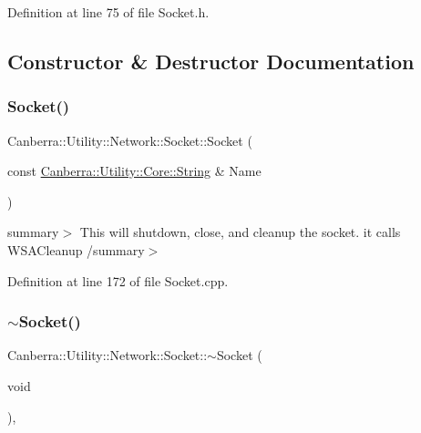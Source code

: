 Definition at line 75 of file Socket.\+h.



\subsection{Constructor \& Destructor Documentation}
\mbox{\label{class_canberra_1_1_utility_1_1_network_1_1_socket_a389aebe967a9895427c19e1e49a39951_a389aebe967a9895427c19e1e49a39951}} 
\subsubsection{\texorpdfstring{Socket()}{Socket()}}
{\footnotesize\ttfamily Canberra\+::\+Utility\+::\+Network\+::\+Socket\+::\+Socket (\begin{DoxyParamCaption}\item[{const \hyperlink{class_canberra_1_1_utility_1_1_core_1_1_string}{Canberra\+::\+Utility\+::\+Core\+::\+String} \&}]{Name }\end{DoxyParamCaption})\hspace{0.3cm}{\ttfamily [protected]}}

summary$>$ This will shutdown, close, and cleanup the socket. it calls W\+S\+A\+Cleanup /summary$>$ 

Definition at line 172 of file Socket.\+cpp.

\mbox{\label{class_canberra_1_1_utility_1_1_network_1_1_socket_a2dfd33d9c2d7c22d9d753c961b9b4cec_a2dfd33d9c2d7c22d9d753c961b9b4cec}} 
\subsubsection{\texorpdfstring{$\sim$\+Socket()}{~Socket()}}
{\footnotesize\ttfamily Canberra\+::\+Utility\+::\+Network\+::\+Socket\+::$\sim$\+Socket (\begin{DoxyParamCaption}\item[{void}]{ }\end{DoxyParamCaption})\hspace{0.3cm}{\ttfamily [protected]}, {\ttfamily [virtual]}}

